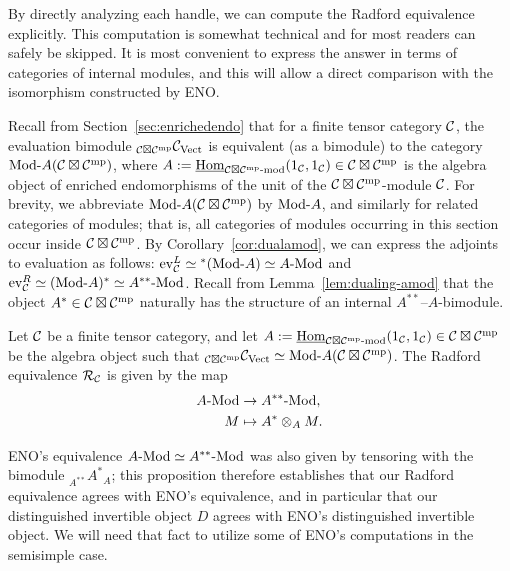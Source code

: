 \documentclass{amsart}
\begin{document}
\nid By directly analyzing each handle, we can compute the Radford equivalence explicitly.  This computation is somewhat technical and for most readers can safely be skipped.  It is most convenient to express the answer in terms of categories of internal modules, and this will allow a direct comparison with the isomorphism constructed by ENO.

Recall from Section~\ref{sec:enrichedendo} that for a finite tensor category $\mathcal C$, the evaluation bimodule ${}_{\mathcal C \boxtimes \mathcal C^{\mathrm{mp}}} \mathcal C_{\mathrm{Vect}}$ is equivalent (as a bimodule) to the category $\Mod{}{A}(\cC \boxtimes \cC^\mp)$, where $A := \IHom_{\mod{\cC \boxtimes \cC^\mp}{}}(1_\cC,1_\cC) \in \cC \boxtimes \cC^\mp$ is the algebra object of enriched endomorphisms of the unit of the $\mathcal C \boxtimes \mathcal C^{\mathrm{mp}}$-module $\mathcal C$.  For brevity, we abbreviate $\Mod{}{A}(\cC \boxtimes \cC^\mp)$ by $\Mod{}{A}$, and similarly for related categories of modules; that is, all categories of modules occurring in this section occur inside $\mathcal C \boxtimes \mathcal C^{\mathrm{mp}}$.  By Corollary~\ref{cor:dualamod}, we can express the adjoints to evaluation as follows: $\ev_\cC^L \simeq {}^*(\Mod{}{A}) \simeq \Mod{A}{}$ and $\ev_\cC^R \simeq (\Mod{}{A})^* \simeq \Mod{A^{**}}{}$.  Recall from Lemma~\ref{lem:dualing-amod} that the object $A^* \in \mathcal C \boxtimes \mathcal C^{\mathrm{mp}}$ naturally has the structure of an internal $A^{**}$--$A$-bimodule.
\begin{proposition} \label{prop:computeradford}
Let $\mathcal C$ be a finite tensor category, and let $A := \IHom_{\mod{\cC \boxtimes \cC^\mp}{}}(1_\cC,1_\cC) \in \cC \boxtimes \cC^\mp$ be the algebra object such that ${}_{\cC \boxtimes \cC^\mp} \cC_\Vect \simeq \Mod{}{A}(\cC \boxtimes \cC^\mp)$.  The Radford equivalence $\mathcal R_\mathcal C$ is given by the map
\begin{align*}
\Mod{A}{} &\ra \Mod{A^{**}}{}, \\
M &\mapsto A^* \otimes_A M.
\end{align*}
\end{proposition}
\nid ENO's equivalence $\Mod{A}{} \simeq \Mod{A^{**}}{}$ was also given by tensoring with the bimodule ${}_{A^{**}} {A^*}_A$; this proposition therefore establishes that our Radford equivalence agrees with ENO's equivalence, and in particular that our distinguished invertible object $D$ agrees with ENO's distinguished invertible object.  We will need that fact to utilize some of ENO's computations in the semisimple case.
\end{document}
